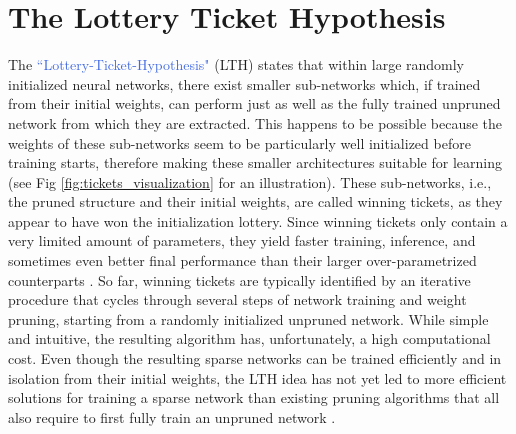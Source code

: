 \section{The Lottery Ticket Hypothesis}
\label{sec:intro}
The \textcolor{RoyalBlue}{``Lottery-Ticket-Hypothesis"} (LTH) \cite{frankle2018lottery} states that within large randomly initialized neural networks, there exist smaller sub-networks which, if trained from their initial weights, can perform just as well as the fully trained unpruned network from which they are extracted. This happens to be possible because the weights of these sub-networks seem to be particularly well initialized before training starts, therefore making these smaller architectures suitable for learning (see Fig \ref{fig:tickets_visualization} for an illustration). These sub-networks, i.e., the pruned structure and their initial weights, are called winning tickets, as they appear to have won the initialization lottery. Since winning tickets only contain a very limited amount of parameters, they yield faster training, inference, and sometimes even better final performance than their larger over-parametrized counterparts \cite{frankle2018lottery,franklestabilizing}. So far, winning tickets are typically identified by an iterative procedure that cycles through several steps of network training and weight pruning, starting from a randomly initialized unpruned network. While simple and intuitive, the resulting algorithm has, unfortunately, a high computational cost. Even though the resulting sparse networks can be trained efficiently and in isolation from their initial weights, the LTH idea has not yet led to more efficient solutions for training a sparse network than existing pruning algorithms that all also require to first fully train an unpruned network \cite{han2015deep,molchanov2016pruning,dong2017learning,lin2017runtime,zhuang2018discrimination}.

